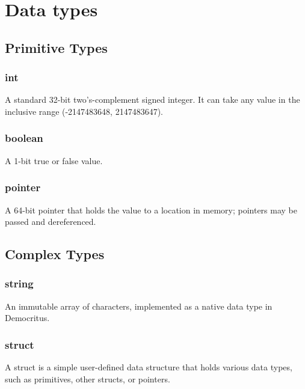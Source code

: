 \section{Data types}
    \subsection{Primitive Types}
        \subsubsection{int}
            A standard 32-bit two's-complement signed integer. It can take any value in the inclusive range (-2147483648, 2147483647).
        \iffalse\subsubsection{float}
            A 64-bit floating precision number, represnted in the IEEE 754 format.            
        \subsubsection{char}
            An 8-bit ASCII character. We include the extended ASCII set, so we use all 256 possible values.\fi
        \subsubsection{boolean}
            A 1-bit true or false value.
        \subsubsection{pointer}
            A 64-bit pointer that holds the value to a location in memory; pointers may be passed and dereferenced.
    \subsection{Complex Types}
         \iffalse\subsubsection{Array}
            A fixed-size array, allocated on the stack and containing other primitive types. The size must be defined at declaration. An array object can be accessed by standard bracket notation, i.e. \texttt{list1[0]}.\fi
        \subsubsection{string}
            An immutable array of characters, implemented as a native data type in Democritus.
       \subsubsection{struct}
            A struct is a simple user-defined data structure that holds various data types, such as primitives, other structs, or pointers. 

